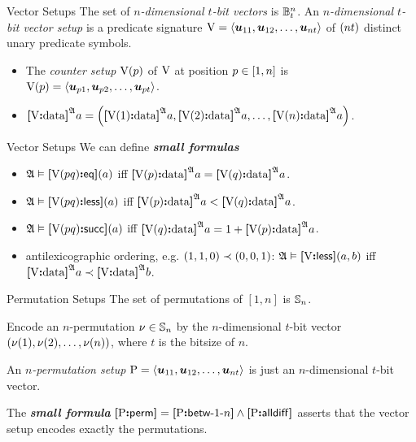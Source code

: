 \documentclass{beamer}
\begin{document}
\begin{frame}{Vector Setups}
The set of \emph{$n$-dimensional $t$-bit vectors} is $\ntBitnums\nn\tbit$.
An \emph{$n$-dimensional $t$-bit vector setup} is a predicate signature  $\VS =
\seq{\suu{11}, \suu{12}, \dots, \suu{\nn\tbit}}$ of $(\nn\tbit)$ distinct unary
predicate symbols.
\begin{itemize}
  \item
  The \emph{counter setup $\VSp\posp$} of $\VS$ at position $\posp \in [1,\nn]$
  is $\VSp\posp = \seq{\suu{\posp1},\suu{\posp2},\dots,\suu{\posp\tbit}}$.
  
  \item
  $\data\VS\StrA\ea = \left(\data{\VSp1}\StrA\ea,\data{\VSp2}\StrA\ea, \dots,
  \data{\VSp\nn}\StrA\ea\right)$.
\end{itemize}
\end{frame}

\begin{frame}{Vector Setups}
We can define \emph{\textbf{small formulas}}
\begin{itemize}
  \item
  $\StrA\vDash\feqP\VS\posp\posq(\ea)$ iff $\data{\VSp\posp}\StrA\ea =
  \data{\VSp\posq}\StrA\ea$.
  
  \item
  $\StrA\vDash\flessP\VS\posp\posq(\ea)$ iff $\data{\VSp\posp}\StrA\ea <
  \data{\VSp\posq}\StrA\ea$.
  
  \item
  $\StrA\vDash\fsuccP\VS\posp\posq(\ea)$ iff $\data{\VSp\posq}\StrA\ea =
  1 + \data{\VSp\posp}\StrA\ea$.
  
  \item
  antilexicographic ordering, e.g. $(1,1,0)\lexlt (0,0,1)$:
  $\StrA\vDash\fless\VS(\ea,\eb)$ iff
  $\data{\VS}\StrA\ea\lexlt\data{\VS}\StrA\eb$.
\end{itemize}
\end{frame}

\begin{frame}{Permutation Setups}
The set of permutations of $[1,n]$ is $\Perms\nn$.

Encode an $n$-permutation $\permnu\in\Perms\nn$ by the
$n$-dimensional $t$-bit vector $(\permnu(1), \permnu(2), \dots, \permnu(n))$,
where $t$ is the bitsize of $n$.

An \emph{$n$-permutation setup} $\PS =
\seq{\suu{11},\suu{12},\dots,\suu{nt}}$ is just an $n$-dimensional $t$-bit
vector.

The \emph{\textbf{small formula}} $\fperm\PS = \fbetw\PS1\nn \land \falldiff\PS$
asserts that the vector setup encodes exactly the permutations.
\end{frame}
\end{document}
